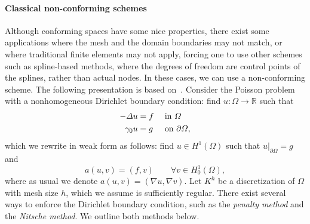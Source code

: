 \paragraph{Classical non-conforming schemes} Although conforming spaces have some nice properties, there exist some applications where the mesh and the domain boundaries may not match, or where traditional finite elements may not apply, forcing one to use other schemes such as spline-based methods, where the degrees of freedom are control points of the splines, rather than actual nodes. In these cases, we can use a non-conforming scheme. The following presentation is based on~\cite{Chouly2024}. Consider the Poisson problem with a nonhomogeneous Dirichlet boundary condition: find $u:\Omega\to \mathbb{R}$ such that
\begin{equation}
    \begin{aligned}
        -\Delta u &= f &&\text{ in } \Omega \\
        \gamma_0 u &= g &&\text{ on } \partial\Omega,
    \end{aligned}
\end{equation}
which we rewrite in weak form as follows: find $u\in H^1(\Omega)$ such that $u|_{\partial\Omega} = g$ and
\begin{equation}
    a(u,v) = (f,v) \qquad \forall v\in H_0^1(\Omega),
\end{equation}
where as usual we denote $a(u,v)=(\nabla u,\nabla v)$. Let $K^h$ be a discretization of $\Omega$ with mesh size $h$, which we assume is sufficiently regular. There exist several ways to enforce the Dirichlet boundary condition, such as the \emph{penalty method} and the \emph{Nitsche method}. We outline both methods below.
